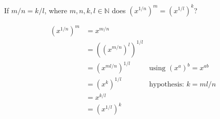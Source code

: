 \documentclass[boxes, qed]{homework}
\begin{document}
\begin{problem}If $m/n=k/l$, where $m,n,k,l\in\mathbb{N}$
  does $(x^{1/n})^m=(x^{1/l})^k$?
\end{problem}
\begin{solution}\begin{align*}
  (x^{1/n})^m
    &= x^{m/n}\\
    &= ((x^{m/n})^l)^{1/l}\\
    &= (x^{ml/n})^{1/l}
      & \text{using $(x^a)^b=x^{ab}$}\\
    &= (x^{k})^{1/l}
      & \text{hypothesis: $k=ml/n$}\\
    &= x^{k/l}\\
    &= (x^{1/l})^k\\
\end{align*}
\end{solution}
\end{document}
